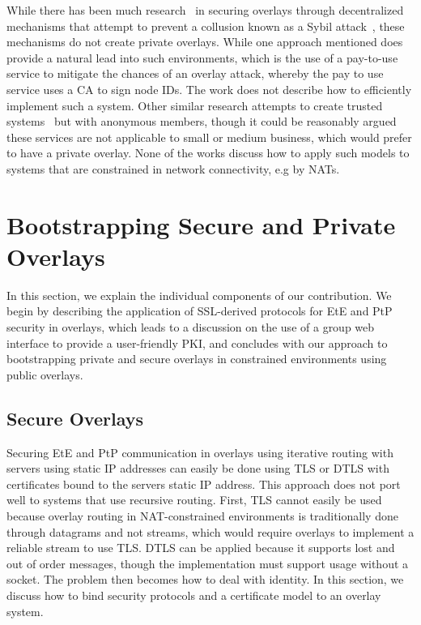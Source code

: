 \documentclass[conference]{IEEEtran}
\begin{document}
While there has been much research~\cite{secure_routing} in securing overlays
through decentralized mechanisms that attempt to prevent a collusion known as
a Sybil attack~\cite{sybil}, these mechanisms do not create private overlays.
While one approach mentioned does provide a natural lead into such
environments, which is the use of a pay-to-use service to mitigate the chances
of an overlay attack, whereby the pay to use service uses a CA to sign node
IDs.  The work does not describe how to efficiently implement such a system.
Other similar research attempts to create trusted systems~\cite{stone, tor} but
with anonymous members, though it could be reasonably argued these services are
not applicable to small or medium business, which would prefer to have a private
overlay.  None of the works discuss how to apply such models to
systems that are constrained in network connectivity, e.g by NATs.

\section{Bootstrapping Secure and Private Overlays}
\label{contributions}
In this section, we explain the individual components of our contribution.  We
begin by describing the application of SSL-derived protocols for EtE and PtP security in
overlays, which leads to a discussion on the use of a group web interface to
provide a user-friendly PKI, and concludes with our approach to bootstrapping
private and secure overlays in constrained environments using public overlays.

\subsection{Secure Overlays}
\label{secure_overlays}
Securing EtE and PtP communication in overlays using iterative routing with
servers using static IP addresses can easily be done using TLS or DTLS with
certificates bound to the servers static IP address.  This approach does not
port well to systems that use recursive routing. First, TLS cannot easily be used
because overlay routing in NAT-constrained environments is traditionally done through datagrams and not streams,
which would require overlays to implement a reliable stream to use TLS. 
DTLS can be applied because it supports lost and out of order messages, though
the implementation must support usage without a socket.  The
problem then becomes how to deal with identity.  In this section, we discuss how
to bind security protocols and a certificate model to an overlay system.
\end{document}
